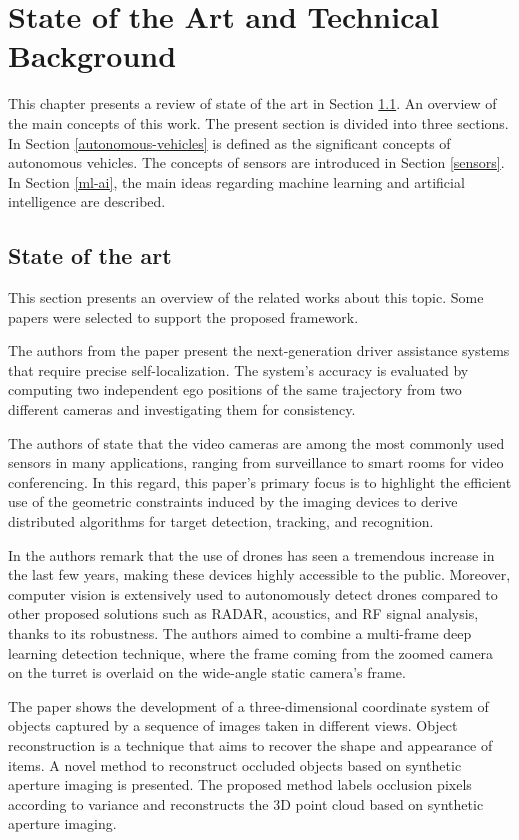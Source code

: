 \chapter{State of the Art and Technical Background}
\label{capitulo3}

This chapter presents a review of state of the art in Section \ref{capitulo2}.  An overview of the main concepts of this work. The present section is divided into three sections. In Section \ref{autonomous-vehicles} is defined as the significant concepts of autonomous vehicles. The concepts of sensors are introduced in Section \ref{sensors}. In Section \ref{ml-ai}, the main ideas regarding machine learning and artificial intelligence are described.

\section{State of the art} \label{capitulo2}

This section presents an overview of the related works about this topic. Some papers were selected to support the proposed framework.

The authors from the paper \cite{Lategahn2013} present the next-generation driver assistance systems that require precise self-localization. The system's accuracy is evaluated by computing two independent ego positions of the same trajectory from two different cameras and investigating them for consistency.

The authors of \cite{Sankaranarayanan2008} state that the video cameras are among the most commonly used sensors in many applications, ranging from surveillance to smart rooms for video conferencing. In this regard, this paper's primary focus is to highlight the efficient use of the geometric constraints induced by the imaging devices to derive distributed algorithms for target detection, tracking, and recognition.

In \cite{Unlu2019} the authors remark that the use of drones has seen a tremendous increase in the last few years, making these devices highly accessible to the public. Moreover, computer vision is extensively used to autonomously detect drones compared to other proposed solutions such as RADAR, acoustics, and RF signal analysis, thanks to its robustness. The authors aimed to combine a multi-frame deep learning detection technique, where the frame coming from the zoomed camera on the turret is overlaid on the wide-angle static camera's frame.

The paper \cite{Pei2019} shows the development of a three-dimensional coordinate system of objects captured by a sequence of images taken in different views. Object reconstruction is a technique that aims to recover the shape and appearance of items. A novel method to reconstruct occluded objects based on synthetic aperture imaging is presented. The proposed method labels occlusion pixels according to variance and reconstructs the 3D point cloud based on synthetic aperture imaging.

